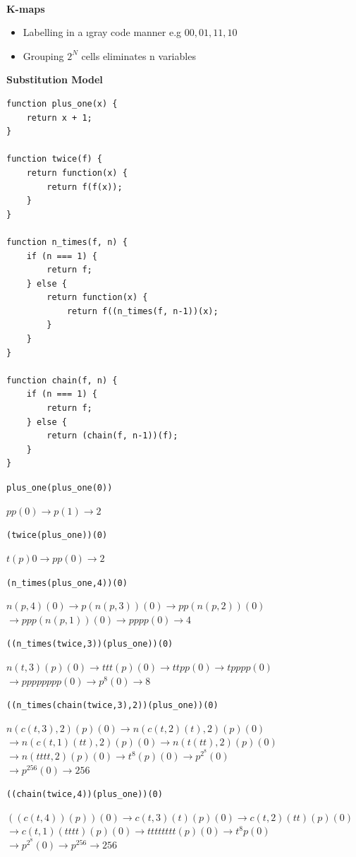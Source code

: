 \documentclass[a4paper]{article} \usepackage[backend=biber, style=numeric, sorting=none]{biblatex}
\begin{document}
\begin{multicols*}{4}
\\ \textbf{K-maps}
\begin{itemize}
\itemsep -0.5em
\item Labelling in a {\i gray code} manner e.g $00, 01, 11, 10$
\item Grouping $2^N$ cells eliminates n variables
\end{itemize}


{\small\textbf{Substitution Model}}
\begin{verbatim}
function plus_one(x) {
    return x + 1;
}

function twice(f) {
    return function(x) {
        return f(f(x));
    }
}

function n_times(f, n) {
    if (n === 1) {
        return f;
    } else {
        return function(x) {
            return f((n_times(f, n-1))(x);
        }
    }
}

function chain(f, n) {
    if (n === 1) {
        return f;
    } else {
        return (chain(f, n-1))(f);
    }
}
\end{verbatim}
\par \texttt{plus\_one(plus\_one(0))}
\par $pp(0) \rightarrow p(1) \rightarrow 2$
\\
\par \texttt{(twice(plus\_one))(0)}
\par $t(p)0 \rightarrow pp(0) \rightarrow 2$
\\
\par \texttt{(n\_times(plus\_one,4))(0)}
\par $n(p,4)(0) \rightarrow p(n(p,3))(0) \rightarrow pp(n(p,2))(0)$\\
     $\rightarrow ppp(n(p,1))(0) \rightarrow pppp(0) \rightarrow 4$
\\
\par \texttt{((n\_times(twice,3))(plus\_one))(0)}
\par $n(t,3)(p)(0) \rightarrow ttt(p)(0) \rightarrow ttpp(0) \rightarrow tpppp(0)$\\
     $\rightarrow pppppppp(0) \rightarrow p^8(0) \rightarrow 8$
\\
\par \texttt{((n\_times(chain(twice,3),2))(plus\_one))(0)}
\par $n(c(t,3),2)(p)(0) \rightarrow n(c(t,2)(t),2)(p)(0)$\\
     $\rightarrow n(c(t,1)(tt), 2)(p)(0) \rightarrow n(t(tt), 2)(p)(0)$\\
     $\rightarrow n(tttt, 2)(p)(0) \rightarrow t^8(p)(0) \rightarrow p^{2^8}(0)$\\
     $\rightarrow p^{256}(0) \rightarrow 256$
\\
\par \texttt{((chain(twice,4))(plus\_one))(0)}
\par $((c(t,4))(p))(0) \rightarrow c(t,3)(t)(p)(0) \rightarrow c(t,2)(tt)(p)(0)$\\
     $\rightarrow c(t,1)(tttt)(p)(0) \rightarrow tttttttt(p)(0) \rightarrow t^8p(0)$\\
     $\rightarrow p^{2^8}(0) \rightarrow p^{256} \rightarrow 256$
\\


\end{multicols*}
\end{document}
